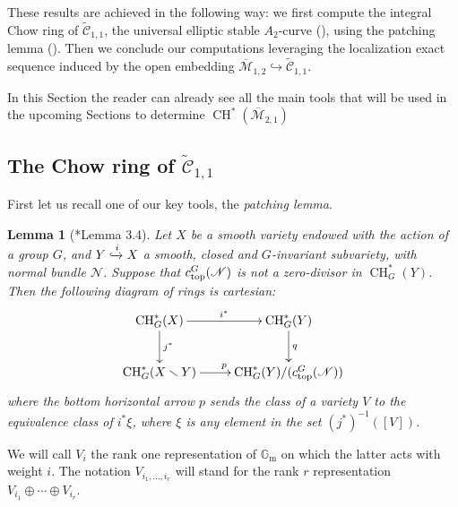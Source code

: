 \documentclass[a4paper, 10pt]{amsart}
\numberwithin{equation}{section}
\numberwithin{subsection}{section}
\newtheorem{lemma}[theorem]{Lemma}
\theoremstyle{definition}
\theoremstyle{remark}
\renewcommand{\mathcal}{\mathscr}
\newcommand\cM{\mathcal{M}} \newcommand\cN{\mathcal{N}}
\newcommand\GG{\mathbb{G}} \newcommand\HH{\mathbb{H}}
\newcommand\rmm{\mathrm{m}} \newcommand\rmn{\mathrm{n}}
\newcommand{\gm}{\GG_{\rmm}}
\newcommand{\Mbar}{\overline{\cM}}
\newcommand{\Ctilde}{\widetilde{\mathcal C}}
\newcommand{\ch}[1][*]{\operatorname{CH}^{#1}}
\begin{document}
	These results are achieved in the following way: we first compute the integral Chow ring of $\Ctilde_{1,1}$, the universal elliptic stable $A_2$-curve (), using the patching lemma (). Then we conclude our computations leveraging the localization exact sequence induced by the open embedding $\Mbar_{1,2}\hookrightarrow\Ctilde_{1,1}$. 
	
	In this Section the reader can already see all the main tools that will be used in the upcoming Sections to determine $\ch(\Mbar_{2,1})$
	\subsection{The Chow ring of $\Ctilde_{1,1}$}
	First let us recall one of our key tools, the \emph{patching lemma}.
	\begin{lemma}[\cite{DLV}*{Lemma 3.4}]\label{lm:Atiyah}
		Let $X$ be a smooth variety endowed with the action of a group $G$, and $Y\xhookrightarrow{i} X$ a smooth, closed and $G$-invariant subvariety, with normal bundle $\cN$. Suppose that $c_{\rm top}^G(\cN)$ is not a zero-divisor in $\ch_G(Y)$. Then the following diagram of rings is cartesian:
		\[\xymatrix{
			\ch_G(X) \ar[r]^{i^*} \ar[d]^{j^*} & \ch_G(Y) \ar[d]^{q} \\
			\ch_G(X\smallsetminus Y) \ar[r]^{p} & \ch_G(Y)/(c_{\rm top}^G(\cN))
		}\]
		where the bottom horizontal arrow $p$ sends the class of a variety $V$ to the equivalence class of $i^*\xi$, where $\xi$ is any element in the set $(j^*)^{-1}([V])$.
	\end{lemma}
	
	We will call $V_i$ the rank one representation of $\gm$ on which the latter acts with weight $i$. The notation $V_{i_1,\dots,i_r}$ will stand for the rank $r$ representation $V_{i_1}\oplus\cdots\oplus V_{i_r}$.
	
\end{document}
